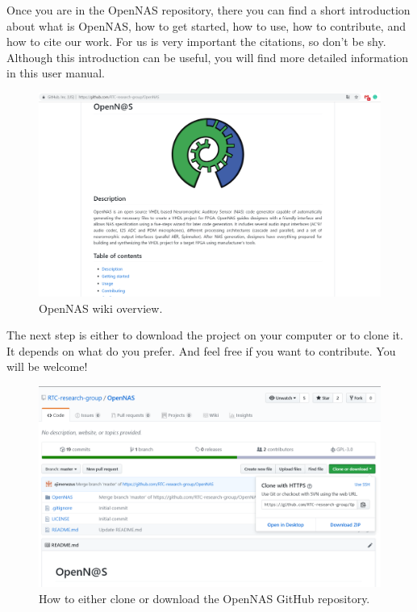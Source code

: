 Once you are in the OpenNAS repository, there you can find a short introduction about what is OpenNAS, how to get started, how to use, how to contribute, and how to cite our work. For us is very important the citations, so don't be shy. Although this introduction can be useful, you will find more detailed information in this user manual.

\begin{figure}[H]
\centering
\includegraphics[width=1\textwidth]{images/Img02_OpenNASWiki_GitHub.PNG}
\caption{\label{fig:OpenNAS_wiki}OpenNAS wiki overview.}
\end{figure}

The next step is either to download the project on your computer or to clone it. It depends on what do you prefer. And feel free if you want to contribute. You will be welcome!

\begin{figure}[H]
\centering
\includegraphics[width=1\textwidth]{images/Img03_Clone_DownloadOpenNAS.PNG}
\caption{\label{fig:Download_clone_OpenNAS_repo}How to either clone or download the OpenNAS GitHub repository.}
\end{figure}

